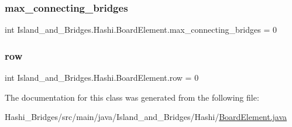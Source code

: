 \subsubsection{\texorpdfstring{max\+\_\+connecting\+\_\+bridges}{max\_connecting\_bridges}}
{\footnotesize\ttfamily int Island\+\_\+and\+\_\+\+Bridges.\+Hashi.\+Board\+Element.\+max\+\_\+connecting\+\_\+bridges = 0}

\mbox{\label{class_island__and___bridges_1_1_hashi_1_1_board_element_adbd3017109d248020dcd93474c99ad60}} 
\subsubsection{\texorpdfstring{row}{row}}
{\footnotesize\ttfamily int Island\+\_\+and\+\_\+\+Bridges.\+Hashi.\+Board\+Element.\+row = 0}



The documentation for this class was generated from the following file\+:\begin{DoxyCompactItemize}
\item 
Hashi\+\_\+\+Bridges/src/main/java/\+Island\+\_\+and\+\_\+\+Bridges/\+Hashi/\mbox{\hyperlink{_board_element_8java}{Board\+Element.\+java}}\end{DoxyCompactItemize}
